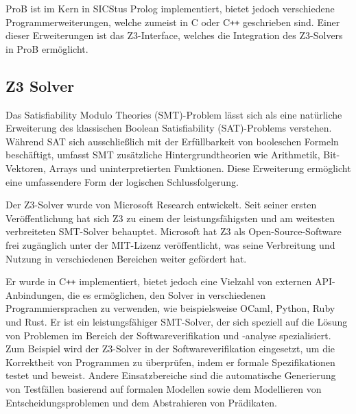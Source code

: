 ProB ist im Kern in SICStus Prolog \cite{carlsson1988sicstus} implementiert, bietet jedoch verschiedene Programmerweiterungen, welche zumeist in C oder C\texttt{++} geschrieben sind.
Einer dieser Erweiterungen ist das Z3-Interface, welches die Integration des Z3-Solvers in ProB ermöglicht.

\subsection{Z3 Solver}

Das Satisfiability Modulo Theories (SMT)-Problem lässt sich als eine natürliche Erweiterung des klassischen Boolean Satisfiability (SAT)-Problems verstehen.
Während SAT sich ausschließlich mit der Erfüllbarkeit von booleschen Formeln beschäftigt,
umfasst SMT zusätzliche Hintergrundtheorien wie Arithmetik, Bit-Vektoren, Arrays und uninterpretierten Funktionen.
Diese Erweiterung ermöglicht eine umfassendere Form der logischen Schlussfolgerung.

Der Z3-Solver \cite{10.1007/978-3-540-78800-3_24} wurde von Microsoft Research entwickelt.
Seit seiner ersten Veröffentlichung hat sich Z3 zu einem der leistungsfähigsten und am weitesten verbreiteten SMT-Solver behauptet.
Microsoft hat Z3 als Open-Source-Software frei zugänglich unter der MIT-Lizenz veröffentlicht,
was seine Verbreitung und Nutzung in verschiedenen Bereichen weiter gefördert hat.

Er wurde in C\texttt{++} implementiert, bietet jedoch eine Vielzahl von externen API-Anbindungen, die es ermöglichen, den Solver in verschiedenen Programmiersprachen zu verwenden,
wie beispielsweise OCaml, Python, Ruby und Rust.
Er ist ein leistungsfähiger SMT-Solver, der sich speziell auf die Lösung von Problemen im Bereich der Softwareverifikation und -analyse spezialisiert.
Zum Beispiel wird der Z3-Solver in der Softwareverifikation eingesetzt, um die Korrektheit von Programmen zu überprüfen, indem er formale Spezifikationen testet und beweist.
Andere Einsatzbereiche sind die automatische Generierung von Testfällen basierend auf formalen Modellen sowie dem Modellieren von Entscheidungsproblemen und dem Abstrahieren von Prädikaten.

